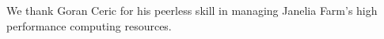 We thank Goran Ceric for his peerless skill in managing Janelia Farm's
high performance computing resources.
